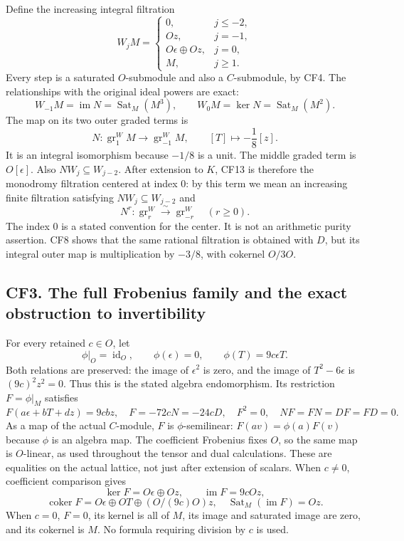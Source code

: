 Define the increasing integral filtration
\[
 W_jM=
 \begin{cases}
 0,&j\leq-2,\\
 Oz,&j=-1,\\
 O\epsilon\oplus Oz,&j=0,\\
 M,&j\geq1.
 \end{cases}
 \tag{CF13}
\]
Every step is a saturated \(O\)-submodule and also a \(C\)-submodule, by CF4. The relationships with the original ideal powers are exact:
\[
 W_{-1}M=\operatorname{im}N=\operatorname{Sat}_M(M^3),
 \qquad W_0M=\ker N=\operatorname{Sat}_M(M^2).
 \tag{CF14}
\]
The map on its two outer graded terms is
\[
 N:\operatorname{gr}^W_1M\longrightarrow\operatorname{gr}^W_{-1}M,
 \qquad [T]\longmapsto-\frac18[z].
 \tag{CF15}
\]
It is an integral isomorphism because \(-1/8\) is a unit. The middle graded term is \(O[\epsilon]\). Also \(NW_j\subseteq W_{j-2}\). After extension to \(K\), CF13 is therefore the monodromy filtration centered at index \(0\): by this term we mean an increasing finite filtration satisfying \(NW_j\subseteq W_{j-2}\) and
\[
 N^r:\operatorname{gr}^W_r\xrightarrow{\sim}\operatorname{gr}^W_{-r}
 \quad(r\geq0).
 \tag{CF16}
\]
The index \(0\) is a stated convention for the center. It is not an arithmetic purity assertion. CF8 shows that the same rational filtration is obtained with \(D\), but its integral outer map is multiplication by \(-3/8\), with cokernel \(O/3O\).

\subsection{CF3. The full Frobenius family and the exact obstruction to invertibility}\label{cf3.-the-full-frobenius-family-and-the-exact-obstruction-to-invertibility}

For every retained \(c\in O\), let
\[
 \phi|_O=\operatorname{id}_O,\qquad
 \phi(\epsilon)=0,\qquad \phi(T)=9c\epsilon T.
 \tag{CF17}
\]
Both relations are preserved: the image of \(\epsilon^2\) is zero, and the image of \(T^2-6\epsilon\) is \((9c)^2z^2=0\). Thus this is the stated algebra endomorphism. Its restriction \(F=\phi|_M\) satisfies
\[
 F(a\epsilon+bT+dz)=9c b z,
 \quad F=-72cN=-24cD,
 \quad F^2=0,
 \quad NF=FN=DF=FD=0.
 \tag{CF18}
\]
As a map of the actual \(C\)-module, \(F\) is \(\phi\)-semilinear: \(F(av)=\phi(a)F(v)\) because \(\phi\) is an algebra map. The coefficient Frobenius fixes \(O\), so the same map is \(O\)-linear, as used throughout the tensor and dual calculations.
These are equalities on the actual lattice, not just after extension of scalars. When \(c\neq0\), coefficient comparison gives
\[
 \ker F=O\epsilon\oplus Oz,
 \qquad\operatorname{im}F=9cOz,
\]
\[
 \operatorname{coker}F
 =O\epsilon\oplus OT\oplus (O/(9c)O)z,
 \quad\operatorname{Sat}_M(\operatorname{im}F)=Oz.
 \tag{CF19}
\]
When \(c=0\), \(F=0\), its kernel is all of \(M\), its image and saturated image are zero, and its cokernel is \(M\). No formula requiring division by \(c\) is used.

